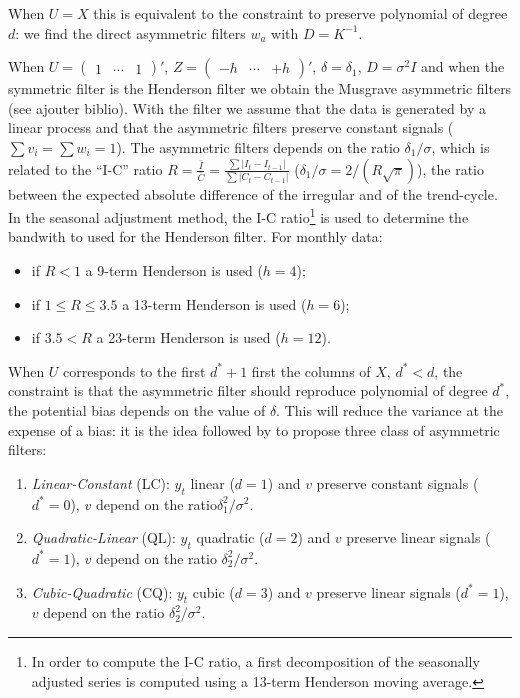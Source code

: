 \documentclass[
  12pt,
  ,
  a4paper]{article}
\newcommand\1{\mathds{1}}
\begin{document}
When \(U=X\) this is equivalent to the constraint to preserve polynomial of degree \(d\): we find the direct asymmetric filters \(w_a\) with \(D=K^{-1}\).

When \(U=\begin{pmatrix}1&\cdots&1\end{pmatrix}'\), \(Z=\begin{pmatrix}-h&\cdots&+h\end{pmatrix}'\), \(\delta=\delta_1\), \(D=\sigma^2I\) and when the symmetric filter is the Henderson filter we obtain the Musgrave asymmetric filters (see \colorbox{BurntOrange}{ajouter biblio}).
With the filter we assume that the data is generated by a linear process and that the asymmetric filters preserve constant signals (\(\sum v_i=\sum w_i=1\)).
The asymmetric filters depends on the ratio \(\delta_1/\sigma\), which is related to the ``I-C'' ratio \(R=\frac{\bar{I}}{\bar{C}}=\frac{\sum\lvert I_t-I_{t-1}\rvert}{\sum\lvert C_t-C_{t-1}\rvert}\) (\(\delta_1/\sigma=2/(R\sqrt{\pi})\)), the ratio between the expected absolute difference of the irregular and of the trend-cycle.
In the seasonal adjustment method, the I-C ratio\footnote{In order to compute the I-C ratio, a first decomposition of the seasonally adjusted series is computed using a 13-term Henderson moving average.} is used to determine the bandwith to used for the Henderson filter. For monthly data:

\begin{itemize}
\item
  if \(R<1\) a 9-term Henderson is used (\(h=4\));
\item
  if \(1\leq R\leq3.5\) a 13-term Henderson is used (\(h=6\));
\item
  if \(3.5< R\) a 23-term Henderson is used (\(h=12\)).
\end{itemize}

When \(U\) corresponds to the first \(d^*+1\) first the columns of \(X\), \(d^*<d\), the constraint is that the asymmetric filter should reproduce polynomial of degree \(d^*\), the potential bias depends on the value of \(\delta\).
This will reduce the variance at the expense of a bias: it is the idea followed by \textcite{proietti2008} to propose three class of asymmetric filters:

\begin{enumerate}
\def\labelenumi{\arabic{enumi}.}
\item
  \emph{Linear-Constant} (LC): \(y_t\) linear (\(d=1\)) and \(v\) preserve constant signals (\(d^*=0\)), \(v\) depend on the ratio\(\delta_1^2/\sigma^2\).
\item
  \emph{Quadratic-Linear} (QL): \(y_t\) quadratic (\(d=2\)) and \(v\) preserve linear signals (\(d^*=1\)), \(v\) depend on the ratio \(\delta_2^2/\sigma^2\).
\item
  \emph{Cubic-Quadratic} (CQ): \(y_t\) cubic (\(d=3\)) and \(v\) preserve linear signals (\(d^*=1\)), \(v\) depend on the ratio \(\delta_2^2/\sigma^2\).
\end{enumerate}
\end{document}
